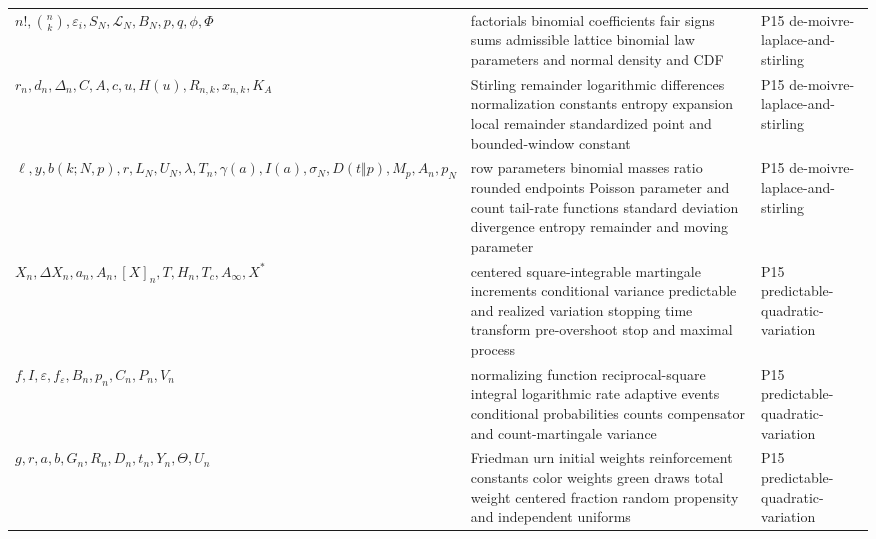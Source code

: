 \begin{longtable}{@{}p{}p{}p{}@{}}
\(n!,\allowbreak \binom nk,\allowbreak \varepsilon_i,\allowbreak S_N,\allowbreak \mathcal L_N,\allowbreak B_N,\allowbreak p,\allowbreak q,\allowbreak \phi,\allowbreak \Phi\) & factorials binomial coefficients fair signs sums admissible lattice binomial law parameters and normal density and CDF & P15 de-\allowbreak{}moivre-\allowbreak{}laplace-\allowbreak{}and-\allowbreak{}stirling \\
\(r_n,\allowbreak d_n,\allowbreak \Delta_n,\allowbreak C,\allowbreak A,\allowbreak c,\allowbreak u,\allowbreak H(u),\allowbreak R_{n,k},\allowbreak x_{n,k},\allowbreak K_A\) & Stirling remainder logarithmic differences normalization constants entropy expansion local remainder standardized point and bounded-window constant & P15 de-\allowbreak{}moivre-\allowbreak{}laplace-\allowbreak{}and-\allowbreak{}stirling \\
\(\ell,\allowbreak y,\allowbreak b(k;\allowbreak N,\allowbreak p),\allowbreak r,\allowbreak L_N,\allowbreak U_N,\allowbreak \lambda,\allowbreak T_n,\allowbreak \gamma(a),\allowbreak I(a),\allowbreak \sigma_N,\allowbreak D(t\Vert p),\allowbreak M_p,\allowbreak A_n,\allowbreak p_N\) & row parameters binomial masses ratio rounded endpoints Poisson parameter and count tail-rate functions standard deviation divergence entropy remainder and moving parameter & P15 de-\allowbreak{}moivre-\allowbreak{}laplace-\allowbreak{}and-\allowbreak{}stirling \\
\(X_n,\allowbreak \Delta X_n,\allowbreak a_n,\allowbreak A_n,\allowbreak [X]_n,\allowbreak T,\allowbreak H_n,\allowbreak T_c,\allowbreak A_\infty,\allowbreak X^*\) & centered square-integrable martingale increments conditional variance predictable and realized variation stopping time transform pre-overshoot stop and maximal process & P15 predictable-\allowbreak{}quadratic-\allowbreak{}variation \\
\(f,\allowbreak I,\allowbreak \varepsilon,\allowbreak f_\varepsilon,\allowbreak B_n,\allowbreak p_n,\allowbreak C_n,\allowbreak P_n,\allowbreak V_n\) & normalizing function reciprocal-square integral logarithmic rate adaptive events conditional probabilities counts compensator and count-martingale variance & P15 predictable-\allowbreak{}quadratic-\allowbreak{}variation \\
\(g,\allowbreak r,\allowbreak a,\allowbreak b,\allowbreak G_n,\allowbreak R_n,\allowbreak D_n,\allowbreak t_n,\allowbreak Y_n,\allowbreak \Theta,\allowbreak U_n\) & Friedman urn initial weights reinforcement constants color weights green draws total weight centered fraction random propensity and independent uniforms & P15 predictable-\allowbreak{}quadratic-\allowbreak{}variation \\

\end{longtable}
